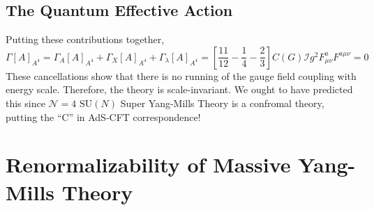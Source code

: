 \documentclass[12pt]{article}
\begin{document}
\subsection{The Quantum Effective Action}

Putting these contributions together,
\[ \Gamma[A]_{A^4} = \Gamma_A[A]_{A^4} + \Gamma_X[A]_{A^4} + \Gamma_{\lambda}[A]_{A^4} = \left[ \frac{11}{12} - \frac{1}{4} - \frac{2}{3} \right] C(G) \mathcal{I} g^2 F^a_{\mu \nu} F^{a \mu \nu} = 0 \]
These cancellations show that there is no running of the gauge field coupling with energy scale. Therefore, the theory is scale-invariant. We ought to have predicted this since $\mathcal{N} = 4$ $\mathrm{SU}(N)$ Super Yang-Mills Theory is a confromal theory, putting the ``C'' in AdS-CFT correspondence! 
 
\section{Renormalizability of Massive Yang-Mills Theory}
\end{document}
